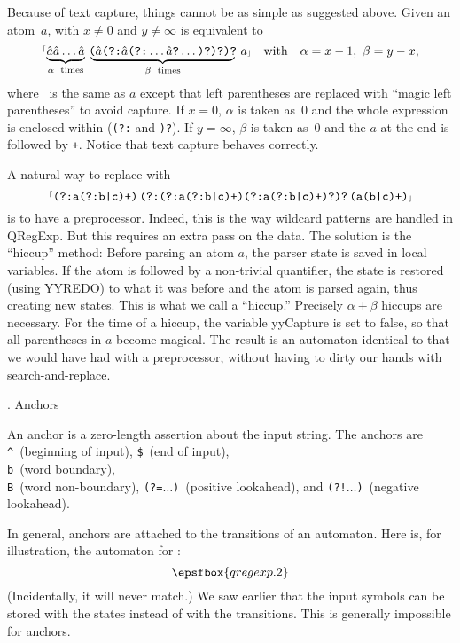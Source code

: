 Because of text capture, things cannot be as simple as suggested above.  Given an atom~$a$,  with $x \ne 0$ and $y \ne \infty$ is equivalent to $$\hbox{\rx{$\underbrace{\hbox{\haha\haha}\ldots\hbox{\haha\vphantom)}}_{\alpha\rm\ times}\,\,\underbrace{\!\hbox{(\haha(?:\haha(?:}\ldots\hbox{\haha?}\ldots\hbox{)?)?)?}\!}_{\beta\rm\ times}\,\,a$}} \quad \hbox{with} \quad \alpha = x - 1,\ \beta = y - x,$$ where \haha~is the same as $a$ except that left parentheses are replaced with ``magic left parentheses'' to avoid capture.  If $x = 0$, $\alpha$ is taken as~$0$ and the whole expression is enclosed within ({\tt (?:} and {\tt )?}).  If $y = \infty$, $\beta$ is taken as~$0$ and the $a$ at the end is followed by {\tt +}.  Notice that text capture behaves correctly.

A natural way to replace  with $$\hbox{{$^{\scriptscriptstyle\lceil}$\tt(?:a(?:b|c)+)$\,$(?:(?:a(?:b|c)+)(?:a(?:b|c)+)?)?$\,$(a(b|c)+)$\scriptscriptstyle\rfloor$}}$$ is to have a preprocessor.  Indeed, this is the way wildcard patterns are handled in {\sf QRegExp}.  But this requires an extra pass on the data.  The solution is the ``hiccup'' method:  Before parsing an atom $a$, the parser state is saved in local variables.  If the atom is followed by a non-trivial quantifier, the state is restored (using {\sf YYREDO}) to what it was before and the atom is parsed again, thus creating new states.  This is what we call a ``hiccup.''  Precisely $\alpha + \beta$ hiccups are necessary.  For the time of a hiccup, the variable {\sf yyCapture} is set to {\sf false}, so that all parentheses in $a$ become magical.  The result is an automaton identical to that we would have had with a preprocessor, without having to dirty our hands with search-and-replace.

. Anchors

An anchor is a zero-length assertion about the input string.  The anchors are {\tt\^}~(beginning of input), {\tt\$}~(end of input), {\tt\\b}~(word boundary), {\tt\\B}~(word non-boundary), {\tt(?=}$\ldots${\tt)}~(positive lookahead), and {\tt(?!}$\ldots${\tt)}~(negative lookahead).

In general, anchors are attached to the transitions of an automaton.  Here is, for illustration, the automaton for :  $$\epsfbox{qregexp.2}$$  (Incidentally, it will never match.)  We saw earlier that the input symbols can be stored with the states instead of with the transitions.  This is generally impossible for anchors.

